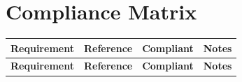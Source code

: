 \documentclass[10pt]{article}
\begin{document}
\section*{Compliance Matrix}
\begin{longtable}{|p{}|p{}|p{}|p{}|}
\hline
\textbf{Requirement} & \textbf{Reference} & \textbf{Compliant} & \textbf{Notes} \\
\hline
\endfirsthead
\hline
\textbf{Requirement} & \textbf{Reference} & \textbf{Compliant} & \textbf{Notes} \\
\hline
\endhead
\hline
\end{longtable}
\end{document}
